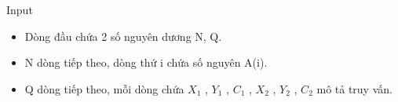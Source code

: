 Input
\begin{itemize}
	\item      Dòng đầu chứa 2 số nguyên dương N, Q.    
	\item      N dòng tiếp theo, dòng thứ i chứa số nguyên A(i).    
	\item     Q dòng tiếp theo, mỗi dòng chứa $X_{1}$    , $Y_{1}$    , $C_{1}$    , $X_{2}$    , $Y_{2}$    , $C_{2}$    mô tả truy vấn.   
\end{itemize}